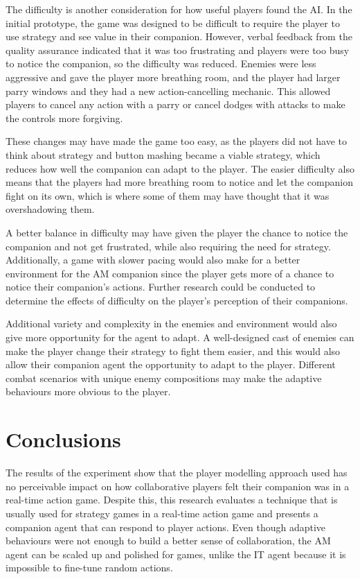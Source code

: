\documentclass{IEEEtran}
\begin{document}
The difficulty is another consideration for how useful players found the AI. In the initial prototype, the game was designed to be difficult to require the player to use strategy and see value in their companion. However, verbal feedback from the quality assurance indicated that it was too frustrating and players were too busy to notice the companion, so the difficulty was reduced. Enemies were less aggressive and gave the player more breathing room, and the player had larger parry windows and they had a new action-cancelling mechanic. This allowed players to cancel any action with a parry or cancel dodges with attacks to make the controls more forgiving.

These changes may have made the game too easy, as the players did not have to think about strategy and button mashing became a viable strategy, which reduces how well the companion can adapt to the player. The easier difficulty also means that the players had more breathing room to notice and let the companion fight on its own, which is where some of them may have thought that it was overshadowing them.

A better balance in difficulty may have given the player the chance to notice the companion and not get frustrated, while also requiring the need for strategy. Additionally, a game with slower pacing would also make for a better environment for the AM companion since the player gets more of a chance to notice their companion’s actions. Further research could be conducted to determine the effects of difficulty on the player’s perception of their companions.

Additional variety and complexity in the enemies and environment would also give more opportunity for the agent to adapt. A well-designed cast of enemies can make the player change their strategy to fight them easier, and this would also allow their companion agent the opportunity to adapt to the player. Different combat scenarios with unique enemy compositions may make the adaptive behaviours more obvious to the player.

\section{Conclusions}
\label{Conclusions}

The results of the experiment show that the player modelling approach used has no perceivable impact on how collaborative players felt their companion was in a real-time action game. Despite this, this research evaluates a technique that is usually used for strategy games in a real-time action game and presents a companion agent that can respond to player actions. Even though adaptive behaviours were not enough to build a better sense of collaboration, the AM agent can be scaled up and polished for games, unlike the IT agent because it is impossible to fine-tune random actions.
\end{document}
